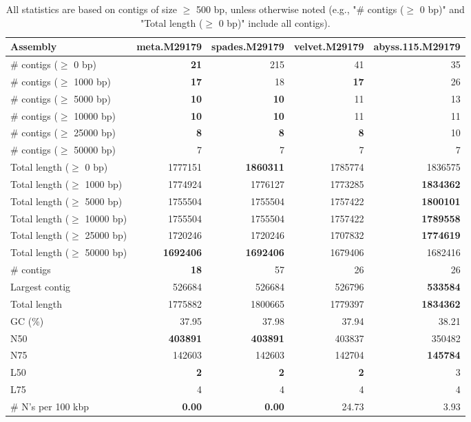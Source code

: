 \documentclass[12pt,a4paper]{article}
\begin{document}
\begin{table}[ht]
\begin{center}
\caption{All statistics are based on contigs of size $\geq$ 500 bp, unless otherwise noted (e.g., "\# contigs ($\geq$ 0 bp)" and "Total length ($\geq$ 0 bp)" include all contigs).}
\begin{tabular}{|l*{4}{|r}|}
\hline
Assembly & meta.M29179 & spades.M29179 & velvet.M29179 & abyss.115.M29179 \\ \hline
\# contigs ($\geq$ 0 bp) & {\bf 21} & 215 & 41 & 35 \\ \hline
\# contigs ($\geq$ 1000 bp) & {\bf 17} & 18 & {\bf 17} & 26 \\ \hline
\# contigs ($\geq$ 5000 bp) & {\bf 10} & {\bf 10} & 11 & 13 \\ \hline
\# contigs ($\geq$ 10000 bp) & {\bf 10} & {\bf 10} & 11 & 11 \\ \hline
\# contigs ($\geq$ 25000 bp) & {\bf 8} & {\bf 8} & {\bf 8} & 10 \\ \hline
\# contigs ($\geq$ 50000 bp) & 7 & 7 & 7 & 7 \\ \hline
Total length ($\geq$ 0 bp) & 1777151 & {\bf 1860311} & 1785774 & 1836575 \\ \hline
Total length ($\geq$ 1000 bp) & 1774924 & 1776127 & 1773285 & {\bf 1834362} \\ \hline
Total length ($\geq$ 5000 bp) & 1755504 & 1755504 & 1757422 & {\bf 1800101} \\ \hline
Total length ($\geq$ 10000 bp) & 1755504 & 1755504 & 1757422 & {\bf 1789558} \\ \hline
Total length ($\geq$ 25000 bp) & 1720246 & 1720246 & 1707832 & {\bf 1774619} \\ \hline
Total length ($\geq$ 50000 bp) & {\bf 1692406} & {\bf 1692406} & 1679406 & 1682416 \\ \hline
\# contigs & {\bf 18} & 57 & 26 & 26 \\ \hline
Largest contig & 526684 & 526684 & 526796 & {\bf 533584} \\ \hline
Total length & 1775882 & 1800665 & 1779397 & {\bf 1834362} \\ \hline
GC (\%) & 37.95 & 37.98 & 37.94 & 38.21 \\ \hline
N50 & {\bf 403891} & {\bf 403891} & 403837 & 350482 \\ \hline
N75 & 142603 & 142603 & 142704 & {\bf 145784} \\ \hline
L50 & {\bf 2} & {\bf 2} & {\bf 2} & 3 \\ \hline
L75 & 4 & 4 & 4 & 4 \\ \hline
\# N's per 100 kbp & {\bf 0.00} & {\bf 0.00} & 24.73 & 3.93 \\ \hline
\end{tabular}
\end{center}
\end{table}
\end{document}
